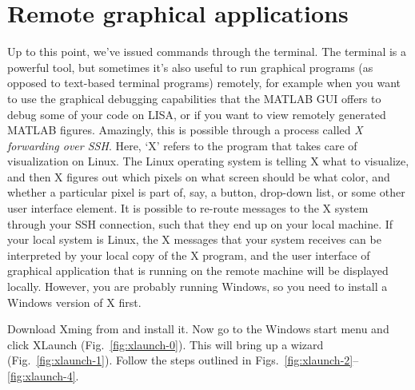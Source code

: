 \chapter{Remote graphical applications}



Up to this point, we've issued commands through the terminal.  The terminal is a powerful tool, but sometimes it's also useful to run graphical programs (as opposed to text-based terminal programs) remotely, for example when you want to use the graphical debugging capabilities that the MATLAB GUI offers to debug some of your code on LISA, or if you want to view remotely generated MATLAB figures.
Amazingly, this is possible through a process called \textit{X forwarding over SSH}. Here, `X' refers to the program that takes care of visualization on Linux. The Linux operating system is telling X what to visualize, and then X figures out which pixels on what screen should be what color, and whether a particular pixel is part of, say, a button, drop-down list, or some other user interface element. It is possible to re-route messages to the X system through your SSH connection, such that they end up on your local machine. If your local system is Linux, the X messages that your system receives can be interpreted by your local copy of the X program, and the user interface of graphical application that is running on the remote machine will be displayed locally. However, you are probably running Windows, so you need to install a Windows version of X first.

Download Xming from  and install it. Now go to the Windows start menu and click XLaunch (Fig.~\ref{fig:xlaunch-0}). This will bring up a wizard (Fig.~\ref{fig:xlaunch-1}). Follow the steps outlined in Figs.~\ref{fig:xlaunch-2}--\ref{fig:xlaunch-4}.

